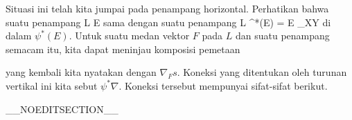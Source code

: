 Situasi ini telah kita jumpai pada penampang horizontal. Perhatikan bahwa suatu penampang
 { L } { E
} {}
sama dengan suatu penampang
 { L  } { \psi^*(E) = E \times_XY
} {}
di dalam
$\psi^*(E)$. Untuk suatu medan vektor $F$ pada $L$ dan suatu penampang semacam itu, kita dapat meninjau komposisi pemetaan

 {  }

yang kembali kita nyatakan dengan $\nabla_F s$. Koneksi yang ditentukan oleh turunan vertikal ini kita sebut 
 {} $\psi^*\nabla$. Koneksi tersebut mempunyai sifat-sifat berikut.

__NOEDITSECTION__


